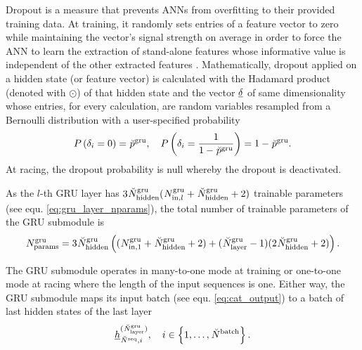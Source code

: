 Dropout is a measure that prevents ANNs from overfitting 
to their provided training data.
At training, 
it randomly sets entries of a feature vector to zero 
while maintaining the vector's signal strength on average
in order to force the ANN to learn the extraction of stand-alone features 
whose informative value is independent of the other extracted features \cite{Hinton2012}.
Mathematically, dropout applied on a hidden state (or feature vector)
is calculated with the Hadamard product (denoted with $\odot$)
of that hidden state and the vector $\GRUDropout$ of same dimensionality 
whose entries, for every calculation, 
are random variables resampled 
from a Bernoulli distribution
with a user-specified probability
\begin{equation}
    P \left( \delta_i = 0 \right) = \GRUDropoutP
    ,\quad
    P \left( \delta_i = \frac{1}{1-\GRUDropoutP} \right) = 1 - \GRUDropoutP
    .
\end{equation}
At racing, the dropout probability is null
whereby the dropout is deactivated.

As the $l$-th GRU layer has $3\GRUHiddenSize (\GRUInp{l} + \GRUHiddenSize + 2)$
trainable parameters (see equ. \ref{eq:gru_layer_nparams}),
the total number of trainable parameters of the GRU submodule is
\begin{align} \label{eq:gru_param}
    \GRUNumP = 3\GRUHiddenSize \tuple{
        (\GRUInp{1} + \GRUHiddenSize + 2)
        + 
        (\GRUNumLayer -1)
        (2\GRUHiddenSize + 2)
    }.
\end{align}

The GRU submodule operates in many-to-one mode at training or 
one-to-one mode at racing where the length of the input sequences is one.
Either way, the GRU submodule maps its input batch
(see equ. \ref{eq:cat_output})
to a batch of last hidden states of the last layer
\begin{equation}
    \hiddenstate[]{(\GRUNumLayer)}{\seqLen, i}{}{}
    , \quad i \in \setOfInts{1, \dots, \batchSize}
    .
\end{equation}




\newcommand{\normDesSpeed}{\speed[\norm]{\drone}{\desired}{}{}}
\newcommand{\waypIRS}{\pos[]{\wayp}{}{\irs}{}}
\newcommand{\headNavDec}{(\normDesSpeed, \waypIRS)}

\newcommand{\desAngVel}{\angvel[]{\drone}{\desired}{\lrs}{}}
\newcommand{\desAngAcc}{\angvel[\dot]{\drone}{\desired}{\lrs}{}}
\newcommand{\desColThrust}{\anything[]{\drone}{\desired}{}{}{c}}
\newcommand{\headCtrlCmd}{(\desAngVel, \desAngAcc, \desColThrust)}

